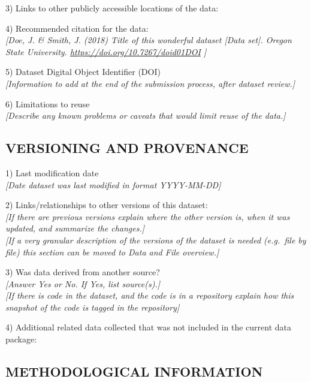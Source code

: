 \documentclass[]{article}
\begin{document}
3) Links to other publicly accessible locations of the data:

4) Recommended citation for the data:\\
\emph{{[}Doe, J. \& Smith, J. (2018) Title of this wonderful dataset
\emph{{[}Data set{]}}. Oregon State University.
\url{https://doi.org/10.7267/doid01DOI} {]}}

5) Dataset Digital Object Identifier (DOI)\\
\emph{{[}Information to add at the end of the submission process, after
dataset review.{]}}

6) Limitations to reuse\\
\emph{{[}Describe any known problems or caveats that would limit reuse
of the data.{]}}

\subsection{VERSIONING AND PROVENANCE}\label{versioning-and-provenance}

1) Last modification date\\
\emph{{[}Date dataset was last modified in format YYYY-MM-DD{]}}

2) Links/relationships to other versions of this dataset:\\
\emph{{[}If there are previous versions explain where the other version
is, when it was updated, and summarize the changes.{]}}\\
\emph{{[}If a very granular description of the versions of the dataset
is needed (e.g.~file by file) this section can be moved to Data and File
overview.{]}}

3) Was data derived from another source?\\
\emph{{[}Answer Yes or No. If Yes, list source(s).{]}}\\
\emph{{[}If there is code in the dataset, and the code is in a
repository explain how this snapshot of the code is tagged in the
repository{]}}

4) Additional related data collected that was not included in the
current data package:

\subsection{METHODOLOGICAL
INFORMATION}\label{methodological-information}
\end{document}
